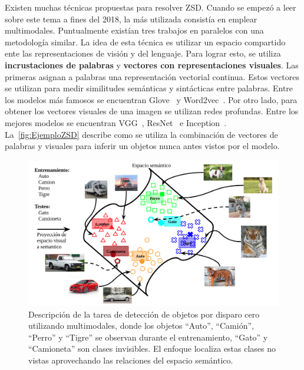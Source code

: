 Existen muchas técnicas propuestas para resolver ZSD. Cuando se empezó a leer sobre este tema a fines del 2018, la más utilizada consistía en emplear multimodales. Puntualmente existían tres trabajos en paralelos \cite{rahman2018zero}\cite{zhu2018zero}\cite{bansal2018zero} con una metodología similar. La idea de esta técnica es utilizar un espacio compartido ente las representaciones de visión y del lenguaje. Para lograr esto, se utiliza  \textbf{incrustaciones de palabras} y \textbf{vectores con representaciones visuales}. Las primeras asignan a palabras una representación vectorial continua. Estos vectores se utilizan para medir similitudes semánticas y sintácticas entre palabras. Entre los modelos más famosos se encuentran Glove~\cite{pennington-etal-2014-glove} y Word2vec~\cite{mikolov2013efficient}. Por otro lado, para obtener los vectores visuales de una imagen se utilizan redes profundas. Entre los mejores modelos se encuentran VGG~\cite{simonyan2014very}, ResNet~\cite{resnet} e Inception~\cite{Szegedy_2015_CVPR}. La~\autoref{fig:EjemploZSD} describe como se utiliza la combinación de vectores de palabras y visuales para inferir un objetos nunca antes vistos por el modelo.\\

\begin{figure}[]
	\centering
	\includegraphics[width=1\textwidth]{img/Modelo.png}
	\caption{Descripción de la tarea de detección de objetos por disparo cero utilizando multimodales, donde los objetos ``Auto'', ``Camión'', ``Perro'' y ``Tigre'' se observan  durante el entrenamiento,  ``Gato'' y ``Camioneta'' son clases invisibles. El enfoque localiza estas clases no vistas aprovechando las relaciones del espacio semántico.}
	\label{fig:EjemploZSD}
\end{figure}

